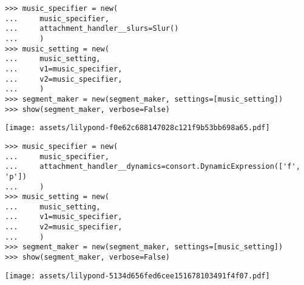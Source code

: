 \begin{comment}
<abjad>[stylesheet=../consort.ily]
music_specifier = new(
    music_specifier,
    attachment_handler__slurs=Slur()
    )
music_setting = new(
    music_setting,
    v1=music_specifier,
    v2=music_specifier,
    )
segment_maker = new(segment_maker, settings=[music_setting])
show(segment_maker, verbose=False)
</abjad>
\end{comment}

\begin{singlespacing}
\vspace{-0.5\baselineskip}
\begin{lstlisting}
>>> music_specifier = new(
...     music_specifier,
...     attachment_handler__slurs=Slur()
...     )
>>> music_setting = new(
...     music_setting,
...     v1=music_specifier,
...     v2=music_specifier,
...     )
>>> segment_maker = new(segment_maker, settings=[music_setting])
>>> show(segment_maker, verbose=False)
\end{lstlisting}
\noindent\texttt{[image: assets/lilypond-f0e62c688147028c121f9b53bb698a65.pdf]}
\end{singlespacing}

\begin{comment}
<abjad>[stylesheet=../consort.ily]
music_specifier = new(
    music_specifier,
    attachment_handler__dynamics=consort.DynamicExpression(['f', 'p'])
    )
music_setting = new(
    music_setting,
    v1=music_specifier,
    v2=music_specifier,
    )
segment_maker = new(segment_maker, settings=[music_setting])
show(segment_maker, verbose=False)
</abjad>
\end{comment}

\begin{singlespacing}
\vspace{-0.5\baselineskip}
\begin{lstlisting}
>>> music_specifier = new(
...     music_specifier,
...     attachment_handler__dynamics=consort.DynamicExpression(['f', 'p'])
...     )
>>> music_setting = new(
...     music_setting,
...     v1=music_specifier,
...     v2=music_specifier,
...     )
>>> segment_maker = new(segment_maker, settings=[music_setting])
>>> show(segment_maker, verbose=False)
\end{lstlisting}
\noindent\texttt{[image: assets/lilypond-5134d656fed6cee151678103491f4f07.pdf]}
\end{singlespacing}

